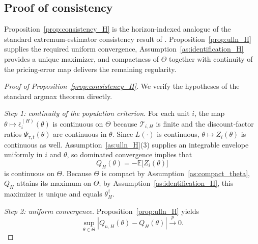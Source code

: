 \subsection{Proof of consistency}

Proposition~\ref{prop:consistency_H} is the horizon-indexed analogue of the standard extremum-estimator consistency result of \citet[Theorem~2.1]{NM94}. Proposition~\ref{prop:ulln_H} supplies the required uniform convergence, Assumption~\ref{as:identification_H} provides a unique maximizer, and compactness of \(\Theta\) together with continuity of the pricing-error map delivers the remaining regularity.

\begin{proof}[Proof of Proposition~\ref{prop:consistency_H}]
	We verify the hypotheses of the standard argmax theorem directly.
	
	\emph{Step 1: continuity of the population criterion.}
	For each unit $i$, the map $\theta \mapsto \bar\epsilon_i^{(H)}(\theta)$ is continuous on $\Theta$
	because $\mathcal T_{i,H}$ is finite and the discount-factor ratios $\Psi_{\tau,t}(\theta)$ are continuous in $\theta$.
	Since $L(\cdot)$ is continuous, $\theta \mapsto Z_i(\theta)$ is continuous as well.
	Assumption~\ref{as:ulln_H}(3) supplies an integrable envelope uniformly in $i$ and $\theta$,
	so dominated convergence implies that
	\[
	Q_H(\theta)
	=
	-
	\mathbb E\bigl[ Z_i(\theta) \bigr]
	\]
	is continuous on $\Theta$.
	Because $\Theta$ is compact by Assumption~\ref{as:compact_theta},
	$Q_H$ attains its maximum on $\Theta$; by Assumption~\ref{as:identification_H},
	this maximizer is unique and equals $\theta_H^\dagger$.
	
	\emph{Step 2: uniform convergence.}
	Proposition~\ref{prop:ulln_H} yields
	\[
	\sup_{\theta\in\Theta}
	\left|
	Q_{n,H}(\theta)-Q_H(\theta)
	\right|
	\xrightarrow{p}0.
	\]
	

\end{proof}

